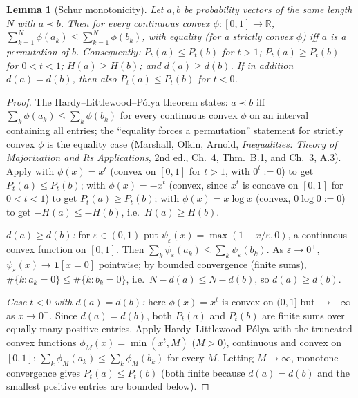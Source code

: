 \documentclass{amsart}
\theoremstyle{plain}
\newtheorem{lemma}{Lemma}
\theoremstyle{definition}
\newcommand{\R}{\mathbb{R}}
\newcommand{\maj}{\prec}
\begin{document}
\begin{lemma}[Schur monotonicity]\label{lem:schur}
Let $a,b$ be probability vectors of the same length $N$ with $a\maj b$. Then for every
continuous convex $\phi:[0,1]\to\R$,
$\sum_{k=1}^N\phi(a_k)\le\sum_{k=1}^N\phi(b_k)$, with equality (for a strictly convex
$\phi$) iff $a$ is a permutation of $b$. Consequently:
$P_t(a)\le P_t(b)$ for $t>1$; $P_t(a)\ge P_t(b)$ for $0<t<1$; $H(a)\ge H(b)$;
and $d(a)\ge d(b)$. If in addition $d(a)=d(b)$, then also $P_t(a)\le P_t(b)$ for $t<0$.
\end{lemma}
\begin{proof}
The Hardy--Littlewood--P\'olya theorem states: $a\maj b$ iff
$\sum_k\phi(a_k)\le\sum_k\phi(b_k)$ for every continuous convex $\phi$ on an interval
containing all entries; the ``equality forces a permutation'' statement for strictly
convex $\phi$ is the equality case (Marshall, Olkin, Arnold, \emph{Inequalities:
Theory of Majorization and Its Applications}, 2nd ed., Ch.~4, Thm.~B.1, and Ch.~3,
A.3). Apply with $\phi(x)=x^t$ (convex on $[0,1]$ for $t>1$, with $0^t:=0$) to get
$P_t(a)\le P_t(b)$; with $\phi(x)=-x^t$ (convex, since $x^t$ is concave on $[0,1]$ for
$0<t<1$) to get $P_t(a)\ge P_t(b)$; with $\phi(x)=x\log x$ (convex, $0\log0:=0$) to get
$-H(a)\le-H(b)$, i.e.\ $H(a)\ge H(b)$.

\emph{$d(a)\ge d(b)$:} for $\varepsilon\in(0,1)$ put
$\psi_\varepsilon(x)=\max(1-x/\varepsilon,0)$, a continuous convex function on $[0,1]$.
Then $\sum_k\psi_\varepsilon(a_k)\le\sum_k\psi_\varepsilon(b_k)$. As
$\varepsilon\to0^+$, $\psi_\varepsilon(x)\to\mathbf 1[x=0]$ pointwise; by bounded
convergence (finite sums), $\#\{k:a_k=0\}\le\#\{k:b_k=0\}$, i.e.\
$N-d(a)\le N-d(b)$, so $d(a)\ge d(b)$.

\emph{Case $t<0$ with $d(a)=d(b)$:} here $\phi(x)=x^t$ is convex on $(0,1]$ but
$\to+\infty$ as $x\to0^+$. Since $d(a)=d(b)$, both $P_t(a)$ and $P_t(b)$ are finite
sums over equally many positive entries. Apply Hardy--Littlewood--P\'olya with the
truncated convex functions $\phi_M(x)=\min(x^t,M)$ ($M>0$), continuous and convex on
$[0,1]$: $\sum_k\phi_M(a_k)\le\sum_k\phi_M(b_k)$ for every $M$. Letting $M\to\infty$,
monotone convergence gives $P_t(a)\le P_t(b)$ (both finite because $d(a)=d(b)$ and the
smallest positive entries are bounded below). 
\end{proof}
\end{document}
